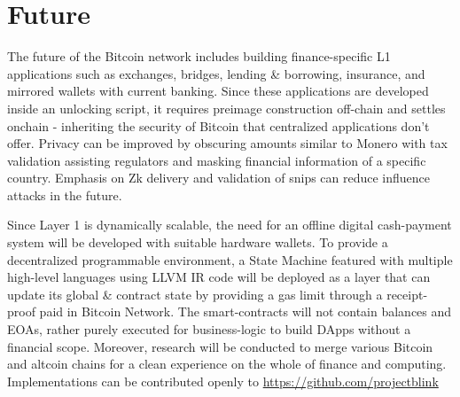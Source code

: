 \documentclass[../Bitcoin Blink.tex]{subfiles}
\begin{document}
\section{Future}

The future of the Bitcoin network includes building finance-specific L1 applications such as exchanges, bridges, lending \& borrowing, insurance, and mirrored wallets with current banking. Since these applications are developed inside an unlocking script, it requires preimage construction off-chain and settles onchain - inheriting the security of Bitcoin that centralized applications don't offer. Privacy can be improved by obscuring amounts similar to Monero with tax validation assisting regulators and masking financial information of a specific country. Emphasis on Zk delivery and validation of snips can reduce influence attacks in the future. 

Since Layer 1 is dynamically scalable, the need for an offline digital cash-payment system will be developed with suitable hardware wallets. To provide a decentralized programmable environment, a State Machine featured with multiple high-level languages using LLVM \cite{llvm} IR code will be deployed as a layer that can update its global \& contract state by providing a gas limit through a receipt-proof paid in Bitcoin Network. The smart-contracts will not contain balances and EOAs, rather purely executed for business-logic to build DApps without a financial scope. Moreover, research will be conducted to merge various Bitcoin and altcoin chains for a clean experience on the whole of finance and computing.\\

\noindent Implementations can be contributed openly to \url{https://github.com/projectblink}
\end{document}
